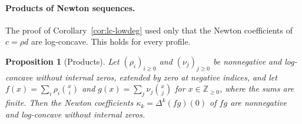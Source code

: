 \documentclass[twoside,10pt]{article}
\numberwithin{equation}{section}
\theoremstyle{slbody}
\newtheorem{proposition}[theorem]{Proposition}
\theoremstyle{definition}
\theoremstyle{remark}
\begin{document}
\paragraph{Products of Newton sequences.}
The proof of Corollary~\ref{cor:lc-lowdeg} used only that the Newton coefficients of $c=\rho d$ are log-concave. This holds for every profile.

\begin{proposition}[Products]\label{prop:np}
Let $(\rho_i)_{i\geq0}$ and $(\nu_j)_{j\geq0}$ be nonnegative and log-concave without internal zeros, extended by zero at negative indices, and let $f(x)=\sum_i\rho_i\binom xi$ and $g(x)=\sum_j\nu_j\binom xj$ for $x\in\mathbb Z_{\geq0}$, where the sums are finite. Then the Newton coefficients $\kappa_k=\Delta^k(fg)(0)$ of $fg$ are nonnegative and log-concave without internal zeros.
\end{proposition}
\end{document}
